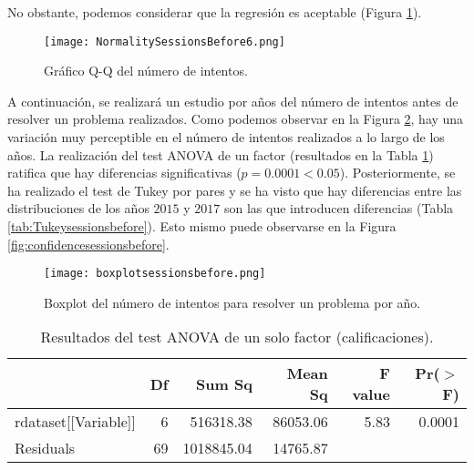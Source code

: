 No obstante, podemos considerar que la regresión es aceptable (Figura \ref{fig:q-qsessionsbefore}).

\begin{figure}[H]
    \centering
    \texttt{[image: NormalitySessionsBefore6.png]}
    \caption{Gráfico Q-Q del número de intentos.}
    \label{fig:q-qsessionsbefore}
\end{figure}

A continuación, se realizará un estudio por años del número de intentos antes de resolver un problema realizados. Como podemos observar en la Figura \ref{fig:boxplotsessionsbefore}, hay una variación muy perceptible en el número de intentos realizados a lo largo de los años. La realización del test ANOVA de un factor (resultados en la Tabla \ref{tab:ANOVAsessionsbefore}) ratifica que hay diferencias significativas ($p = 0.0001 < 0.05$). Posteriormente, se ha realizado el test de Tukey por pares y se ha visto que hay diferencias entre las distribuciones de los años $2015$ y $2017$ son las que introducen diferencias (Tabla \ref{tab:Tukeysessionsbefore}). Esto mismo puede observarse en la Figura \ref{fig:confidencesessionsbefore}.

\begin{figure}[H]
    \centering
    \texttt{[image: boxplotsessionsbefore.png]}
    \caption{Boxplot del número de intentos para resolver un problema por año.}
    \label{fig:boxplotsessionsbefore}
\end{figure}

\begin{table}[H]
\centering
\caption{Resultados del test ANOVA de un solo factor (calificaciones).}
\label{tab:ANOVAsessionsbefore}
\begin{tabular}{lrrrrr}
  \hline
 & Df & Sum Sq & Mean Sq & F value & Pr($>$F) \\ 
  \hline
rdataset[[Variable]] & 6 & 516318.38 & 86053.06 & 5.83 & 0.0001 \\ 
  Residuals            & 69 & 1018845.04 & 14765.87 &  &  \\ 
   \hline
\end{tabular}
\end{table}

